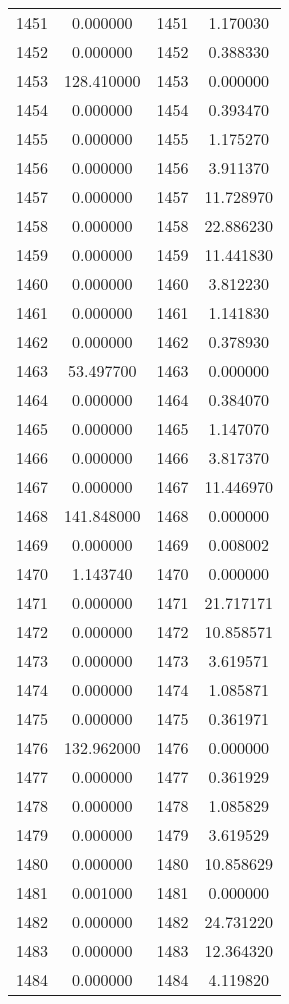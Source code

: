 \documentclass[12pt]{article}
\begin{document}
\begin{longtable}{@{}cccc@{}}
1451 & 0.000000 & 1451 & 1.170030 \\
1452 & 0.000000 & 1452 & 0.388330 \\
1453 & 128.410000 & 1453 & 0.000000 \\
1454 & 0.000000 & 1454 & 0.393470 \\
1455 & 0.000000 & 1455 & 1.175270 \\
1456 & 0.000000 & 1456 & 3.911370 \\
1457 & 0.000000 & 1457 & 11.728970 \\
1458 & 0.000000 & 1458 & 22.886230 \\
1459 & 0.000000 & 1459 & 11.441830 \\
1460 & 0.000000 & 1460 & 3.812230 \\
1461 & 0.000000 & 1461 & 1.141830 \\
1462 & 0.000000 & 1462 & 0.378930 \\
1463 & 53.497700 & 1463 & 0.000000 \\
1464 & 0.000000 & 1464 & 0.384070 \\
1465 & 0.000000 & 1465 & 1.147070 \\
1466 & 0.000000 & 1466 & 3.817370 \\
1467 & 0.000000 & 1467 & 11.446970 \\
1468 & 141.848000 & 1468 & 0.000000 \\
1469 & 0.000000 & 1469 & 0.008002 \\
1470 & 1.143740 & 1470 & 0.000000 \\
1471 & 0.000000 & 1471 & 21.717171 \\
1472 & 0.000000 & 1472 & 10.858571 \\
1473 & 0.000000 & 1473 & 3.619571 \\
1474 & 0.000000 & 1474 & 1.085871 \\
1475 & 0.000000 & 1475 & 0.361971 \\
1476 & 132.962000 & 1476 & 0.000000 \\
1477 & 0.000000 & 1477 & 0.361929 \\
1478 & 0.000000 & 1478 & 1.085829 \\
1479 & 0.000000 & 1479 & 3.619529 \\
1480 & 0.000000 & 1480 & 10.858629 \\
1481 & 0.001000 & 1481 & 0.000000 \\
1482 & 0.000000 & 1482 & 24.731220 \\
1483 & 0.000000 & 1483 & 12.364320 \\
1484 & 0.000000 & 1484 & 4.119820 \\

\end{longtable}
\end{document}
